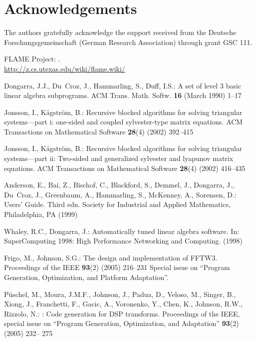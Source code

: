 \documentclass{llncs}
\begin{document}
\section{Acknowledgements}
The authors gratefully acknowledge the support received from the
Deutsche Forschungsgemeinschaft (German Research Association) through
grant GSC 111.




\begin{thebibliography}{10}

{FLAME {P}roject}:
.
\newblock \\\url{http://z.cs.utexas.edu/wiki/flame.wiki/}

Dongarra, J.J., Du~Croz, J., Hammarling, S., Duff, I.S.:
\newblock A set of level 3 basic linear algebra subprograms.
\newblock ACM Trans. Math. Softw. \textbf{16} (March 1990)  1--17

Jonsson, I., K{\aa}gstr\"om, B.:
\newblock Recursive blocked algorithms for solving triangular systems---part i:
  one-sided and coupled sylvester-type matrix equations.
\newblock ACM Transactions on Mathematical Software \textbf{28}(4) (2002)
  392--415

Jonsson, I., K{\aa}gstr\"om, B.:
\newblock Recursive blocked algorithms for solving triangular systems---part
  ii: Two-sided and generalized sylvester and lyapunov matrix equations.
\newblock ACM Transactions on Mathematical Software \textbf{28}(4) (2002)
  416--435

Anderson, E., Bai, Z., Bischof, C., Blackford, S., Demmel, J., Dongarra, J.,
  Du~Croz, J., Greenbaum, A., Hammarling, S., McKenney, A., Sorensen, D.:
 Users' Guide. Third edn.
\newblock Society for Industrial and Applied Mathematics, Philadelphia, PA
  (1999)

Whaley, R.C., Dongarra, J.:
\newblock Automatically tuned linear algebra software.
\newblock In: SuperComputing 1998: High Performance Networking and Computing.
  (1998)

Frigo, M., Johnson, S.G.:
\newblock The design and implementation of {FFTW3}.
\newblock Proceedings of the IEEE \textbf{93}(2) (2005)  216--231 Special issue
  on ``Program Generation, Optimization, and Platform Adaptation''.

P{\"u}schel, M., Moura, J.M.F., Johnson, J., Padua, D., Veloso, M., Singer, B.,
  Xiong, J., Franchetti, F., Gacic, A., Voronenko, Y., Chen, K., Johnson, R.W.,
  Rizzolo, N.:
: Code generation for {DSP} transforms.
\newblock Proceedings of the IEEE, special issue on ``Program Generation,
  Optimization, and Adaptation'' \textbf{93}(2) (2005)  232-- 275


\end{thebibliography}
\end{document}
